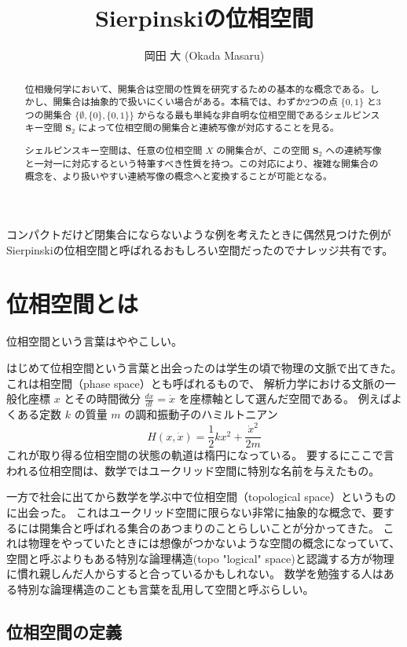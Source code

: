 \documentclass[uplatex,a4j,12pt,dvipdfmx]{jsarticle}
\title{
Sierpinskiの位相空間
}
\author{
岡田 大 (Okada Masaru)
}
\begin{document}
\maketitle

コンパクトだけど閉集合にならないような例を考えたときに偶然見つけた例がSierpinskiの位相空間と呼ばれるおもしろい空間だったのでナレッジ共有です。

\begin{abstract}
	位相幾何学において、開集合は空間の性質を研究するための基本的な概念である。しかし、開集合は抽象的で扱いにくい場合がある。本稿では、わずか2つの点 $\{0, 1\}$ と3つの開集合 $\{\emptyset, \{0\}, \{0, 1\}\}$ からなる最も単純な非自明な位相空間であるシェルピンスキー空間 $\mathbf{S}_ {2}$ によって位相空間の開集合と連続写像が対応することを見る。

	シェルピンスキー空間は、任意の位相空間 $X$ の開集合が、この空間 $\mathbf{S}_ {2}$ への連続写像と一対一に対応するという特筆すべき性質を持つ。この対応により、複雑な開集合の概念を、より扱いやすい連続写像の概念へと変換することが可能となる。
\end{abstract}

\section{位相空間とは}

位相空間という言葉はややこしい。

はじめて位相空間という言葉と出会ったのは学生の頃で物理の文脈で出てきた。
これは相空間（phase space）とも呼ばれるもので、
解析力学における文脈の一般化座標 $x$ とその時間微分 $\frac{dx}{dt} = \dot{x}$ を座標軸として選んだ空間である。
例えばよくある定数 $k$ の質量 $m$ の調和振動子のハミルトニアン
$$
	H(x,\dot{x}) = \frac{1}{2}kx^{2}  + \frac{\dot{x}^{2}}{2m}
$$
これが取り得る位相空間の状態の軌道は楕円になっている。
要するにここで言われる位相空間は、数学ではユークリッド空間に特別な名前を与えたもの。

一方で社会に出てから数学を学ぶ中で位相空間（topological space）というものに出会った。
これはユークリッド空間に限らない非常に抽象的な概念で、要するには開集合と呼ばれる集合のあつまりのことらしいことが分かってきた。
これは物理をやっていたときには想像がつかないような空間の概念になっていて、空間と呼ぶよりもある特別な論理構造(topo "logical" space)と認識する方が物理に慣れ親しんだ人からすると合っているかもしれない。
数学を勉強する人はある特別な論理構造のことも言葉を乱用して空間と呼ぶらしい。


\subsection{位相空間の定義}
\end{document}
